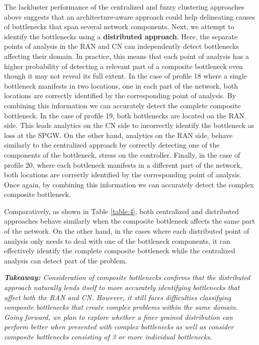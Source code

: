 \documentclass[journal,comsoc]{IEEEtran}
\begin{document}
% 
The lackluster performance of the centralized and fuzzy clustering approaches above suggests that an architecture-aware approach could help delineating causes of bottlenecks that span several network components.      
Next, we attempt to identify the bottlenecks using a \textbf{distributed approach}.
Here, the separate points of analysis in the RAN and CN can independently detect bottlenecks affecting their domain. 
In practice, this means that each point of analysis has a higher probability of detecting a relevant part of a composite bottleneck even though it may not reveal its full extent.
In the case of profile 18 where a single bottleneck manifests in two locations, one in each part of the network, both locations are correctly identified by the corresponding point of analysis.
By combining this information we can accurately detect the complete composite bottleneck.
In the case of profile 19, both bottlenecks are located on the RAN side. This leads analytics on the CN side to incorrectly identify the bottleneck as loss at the SPGW. On the other hand, analytics on the RAN side, behave similarly to the centralized approach by correctly detecting one of the components of the bottleneck, stress on the controller.
Finally, in the case of profile 20, where each bottleneck manifests in a different part of the network, both locations are correctly identified by the corresponding point of analysis.
Once again, by combining this information we can accurately detect the complex composite bottleneck.

Comparatively, as shown in Table \ref{table:4}, both centralized and distributed approaches behave similarly when the composite bottleneck affects the same part of the network. On the other hand, in the cases where each distributed point of analysis only needs to deal with one of the bottleneck components, it can effectively identify the complete composite bottleneck while the centralized analysis can detect part of the problem.


{\em \textbf{Takeaway:}
Consideration of composite bottlenecks confirms that the distributed approach naturally lends itself to more accurately identifying bottlenecks that affect both the RAN and CN.
However, it still faces difficulties classifying composite bottlenecks that create complex problems within the same domain.
Going forward, we plan to explore whether a finer grained distribution can perform better when presented with complex bottlenecks as well as consider composite bottlenecks consisting of 3 or more individual bottlenecks.
}
\end{document}
